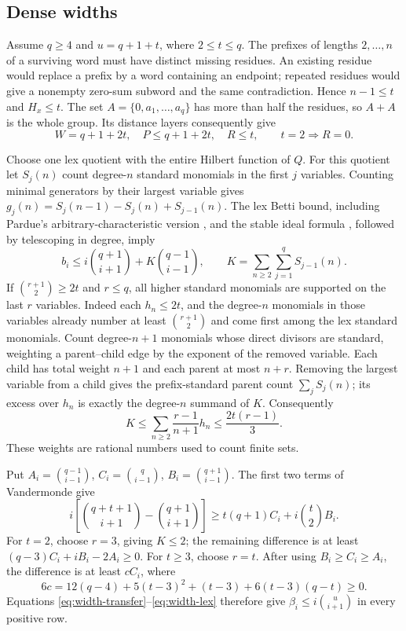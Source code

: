 \subsection{Dense widths}

Assume $q\ge4$ and $u=q+1+t$, where $2\le t\le q$.
The prefixes of lengths $2,\ldots,n$ of a surviving word must have
distinct missing residues.  An existing residue would replace a prefix
by a word containing an endpoint; repeated residues would give a
nonempty zero-sum subword and the same contradiction.  Hence
$n-1\le t$ and $H_x\le t$.
The set $A=\{0,a_1,\ldots,a_q\}$ has more than half the residues, so
$A+A$ is the whole group.  Its distance layers consequently give
\begin{equation}\label{eq:width-dense-resources}
 W=q+1+2t,\quad P\le q+1+2t,\quad R\le t,
 \qquad t=2\Longrightarrow R=0.
\end{equation}

Choose one lex quotient with the entire Hilbert function of $Q$.
For this quotient let $S_j(n)$ count degree-$n$ standard monomials in
the first $j$ variables.  Counting minimal generators by their largest
variable gives
$g_j(n)=S_j(n-1)-S_j(n)+S_{j-1}(n)$.
The lex Betti bound, including Pardue's arbitrary-characteristic version
\cite[Theorem~31]{Pardue}, and the stable ideal formula \cite{BHP,EK}, followed
by telescoping in degree, imply
\begin{equation}\label{eq:width-lex}
 b_i\le i\binom{q+1}{i+1}+K\binom{q-1}{i-1},
 \qquad K=\sum_{n\ge2}\sum_{j=1}^qS_{j-1}(n).
\end{equation}
If $\binom{r+1}2\ge2t$ and $r\le q$, all higher standard monomials
are supported on the last $r$ variables.  Indeed each $h_n\le2t$,
and the degree-$n$ monomials in those variables already number at least
$\binom{r+1}2$ and come first among the lex standard monomials.
Count degree-$n+1$ monomials
whose direct divisors are standard, weighting a parent--child edge by
the exponent of the removed variable.  Each child has total weight
$n+1$ and each parent at most $n+r$.
Removing the largest variable from a child gives the prefix-standard
parent count $\sum_jS_j(n)$; its excess over $h_n$ is exactly the
degree-$n$ summand of $K$.  Consequently
\[
 K\le\sum_{n\ge2}\frac{r-1}{n+1}h_n
       \le\frac{2t(r-1)}3.
\]
These weights are rational numbers used to count finite sets.

Put $A_i=\binom{q-1}{i-1}$, $C_i=\binom q{i-1}$,
$B_i=\binom{q+1}{i-1}$.  The first two terms of Vandermonde give
\[
 i\left[\binom{q+t+1}{i+1}-\binom{q+1}{i+1}\right]
 \ge t(q+1)C_i+i\binom t2B_i.
\]
For $t=2$, choose $r=3$, giving $K\le2$; the remaining difference is
at least $(q-3)C_i+iB_i-2A_i\ge0$.
For $t\ge3$, choose $r=t$.  After using $B_i\ge C_i\ge A_i$, the
difference is at least $cC_i$, where
\[
 6c=12(q-4)+5(t-3)^2+(t-3)+6(t-3)(q-t)\ge0.
\]
Equations \eqref{eq:width-transfer}--\eqref{eq:width-lex} therefore
give $\beta_i\le i\binom u{i+1}$ in every positive row.

